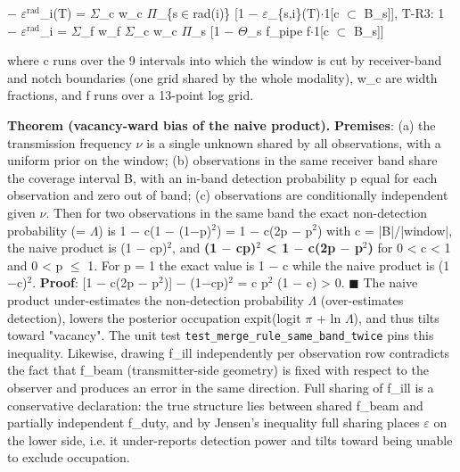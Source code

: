 \documentclass{aa}
\begin{document}
 \(-\) \(\varepsilon\)\(^{\mathrm{rad}}\)\_i(T) = \(\Sigma\)\_c w\_c \(\Pi\)\_\{s\(\in\)rad(i)\} [1 \(-\) \(\varepsilon\)\_\{s,i\}(T)\(\cdot\)1[c \(\subset\) B\_s]],  T-R3: 1 \(-\) \(\varepsilon\)\(^{\mathrm{rad}}\)\_i = \(\Sigma\)\_f w\_f \(\Sigma\)\_c w\_c \(\Pi\)\_s [1 \(-\) \(\Theta\)\_s f\_pipe f\(\cdot\)1[c \(\subset\) B\_s]]\par\smallskip

\noindent where c runs over the 9 intervals into which the window is cut by receiver-band and notch boundaries (one grid shared by the whole modality), w\_c are width fractions, and f runs over a 13-point log grid.\par\smallskip

\noindent \textbf{Theorem (vacancy-ward bias of the naive product).} \textbf{Premises}: (a) the transmission frequency \(\nu\) is a single unknown shared by all observations, with a uniform prior on the window; (b) observations in the same receiver band share the coverage interval B, with an in-band detection probability p equal for each observation and zero out of band; (c) observations are conditionally independent given \(\nu\). Then for two observations in the same band the exact non-detection probability (= \(\Lambda\)) is 1 \(-\) c(1 \(-\) (1\(-\)p)\(^{2}\)) = 1 \(-\) c(2p \(-\) p\(^{2}\)) with c = |B|/|window|, the naive product is (1 \(-\) cp)\(^{2}\), and \textbf{(1 \(-\) cp)\(^{2}\) < 1 \(-\) c(2p \(-\) p\(^{2}\))} for 0 < c < 1 and 0 < p \(\leq\) 1. For p = 1 the exact value is 1 \(-\) c while the naive product is (1\(-\)c)\(^{2}\). \textbf{Proof}: [1 \(-\) c(2p \(-\) p\(^{2}\))] \(-\) (1\(-\)cp)\(^{2}\) = c p\(^{2}\) (1 \(-\) c) > 0. \(\blacksquare\) The naive product under-estimates the non-detection probability \(\Lambda\) (over-estimates detection), lowers the posterior occupation expit(logit \(\pi\) + ln \(\Lambda\)), and thus tilts toward "vacancy". The unit test \texttt{test\_merge\_rule\_same\_band\_twice} pins this inequality. Likewise, drawing f\_ill independently per observation row contradicts the fact that f\_beam (transmitter-side geometry) is fixed with respect to the observer and produces an error in the same direction. Full sharing of f\_ill is a conservative declaration: the true structure lies between shared f\_beam and partially independent f\_duty, and by Jensen's inequality full sharing places \(\varepsilon\) on the lower side, i.e. it under-reports detection power and tilts toward being unable to exclude occupation.\par\smallskip
\end{document}
